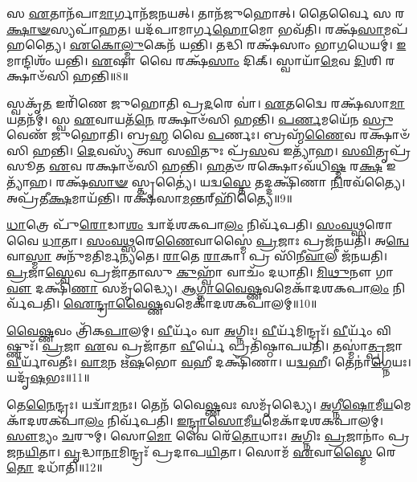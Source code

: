 𑌸 \ul{𑌏}\-𑌤𑌾𑌨᳴𑌪𑌾\-\ul{𑌮𑌾}\-𑌰𑍍𑌗𑌾𑌨᳴𑌜𑌨𑌯𑌤𑍍।
𑌤𑌾𑌨᳴𑌜𑍁𑌹𑍋𑌤𑍍।
𑌤𑍈𑌰𑍍𑌵𑍈 𑌸 𑌰\-\ul{𑌕𑍍𑌷𑌾}\-\-\ul{𑍟}\-𑌸𑍍𑌯𑌪𑌾᳴𑌹𑌤।
𑌯𑌦᳴𑌪𑌾𑌮𑌾𑌰𑍍𑌗\-\ul{𑌹𑍋}\-𑌮𑍋 𑌭𑌵᳴𑌤𑌿।
𑌰𑌕𑍍𑌷᳴\-\ul{𑌸𑌾}\-𑌮𑌪᳴𑌹𑌤𑍍𑌯𑍈।
\-\ul{𑌏}\-\-\ul{𑌕𑍋}\-\-\ul{𑌲𑍍𑌮𑍁}\-𑌕𑍇𑌨᳴ 𑌯𑌨𑍍𑌤𑌿।
𑌤𑌦𑍍𑌧𑌿 𑌰𑌕𑍍𑌷᳴𑌸𑌾𑌂 𑌭𑌾\-\ul{𑌗}\-𑌧𑍇𑌯𑌮𑍍॑।
\-\ul{𑌇}\-𑌮𑌾𑌨𑍍𑌦𑌿𑌶𑌂᳴ 𑌯𑌨𑍍𑌤𑌿।
\-\ul{𑌏}\-𑌷𑌾 𑌵𑍈 𑌰𑌕𑍍𑌷᳴\-\ul{𑌸𑌾𑌂} 𑌦𑌿𑌕𑍍।
𑌸𑍍𑌵𑌾𑌯𑌾᳴\-\ul{𑌮𑍇}\-𑌵 \ul{𑌦𑌿}\-𑌶𑌿 𑌰𑌕𑍍𑌷𑌾𑍞᳴𑌸𑌿 𑌹𑌨𑍍𑌤𑌿॥8॥

𑌸𑍍𑌵𑌕𑍃᳴\-\ul{𑌤} 𑌇𑌰𑌿᳴𑌣𑍇 𑌜𑍁𑌹𑍋𑌤𑌿 𑌪𑍍𑌰\-\ul{𑌦}\-𑌰𑍇 𑌵𑌾॑।
\-\ul{𑌏}\-𑌤𑌦𑍍𑌵𑍈 𑌰𑌕𑍍𑌷᳴𑌸𑌾\-\ul{𑌮𑌾}\-𑌯𑌤𑌨᳴𑌮𑍍।
𑌸𑍍𑌵 \ul{𑌏}\-𑌵𑌾𑌯𑌤᳴\-\ul{𑌨𑍇} 𑌰𑌕𑍍𑌷𑌾𑍞᳴𑌸𑌿 𑌹𑌨𑍍𑌤𑌿।
\-\ul{𑌪}\-\-\ul{𑌰𑍍𑌣}\-𑌮𑌯𑍇᳴𑌨 \ul{𑌸𑍍𑌰𑍁}\-𑌵𑍇𑌣᳴ 𑌜𑍁𑌹𑍋𑌤𑌿।
𑌬𑍍𑌰\-\ul{𑌹𑍍𑌮} 𑌵𑍈 \ul{𑌪}\-𑌰𑍍𑌣𑌃।
𑌬𑍍𑌰𑌹𑍍𑌮᳴\-\ul{𑌣𑍈}\-𑌵 𑌰𑌕𑍍𑌷𑌾𑍞᳴𑌸𑌿 𑌹𑌨𑍍𑌤𑌿।
\-\ul{𑌦𑍇}\-𑌵𑌸𑍍𑌯᳴ 𑌤𑍍𑌵𑌾 𑌸\-\ul{𑌵𑌿}\-𑌤𑍁𑌃 𑌪𑍍𑌰᳴\-\ul{𑌸}\-𑌵 𑌇𑌤𑍍𑌯𑌾᳴𑌹।
\-\ul{𑌸}\-\-\ul{𑌵𑌿}\-𑌤𑍃𑌪𑍍𑌰᳴𑌸𑍂𑌤 \ul{𑌏}\-𑌵 𑌰𑌕𑍍𑌷𑌾𑍞᳴𑌸𑌿 𑌹𑌨𑍍𑌤𑌿।
\-\ul{𑌹}\-𑌤𑍞 𑌰𑌕𑍍𑌷𑍋\-𑌽𑌵᳴𑌧𑌿\-\ul{𑌷𑍍𑌮} 𑌰\-\ul{𑌕𑍍𑌷} 𑌇𑌤𑍍𑌯𑌾᳴𑌹।
𑌰𑌕𑍍𑌷᳴\-\ul{𑌸𑌾}\-\-\ul{𑍟} 𑌸𑍍𑌤𑍃𑌤𑍍𑌯𑍈॑।
𑌯𑌦𑍍𑌵\-\ul{𑌸𑍍𑌤𑍇} 𑌤𑌦𑍍𑌦𑌕𑍍𑌷𑌿᳴𑌣𑌾 \ul{𑌨𑌿}\-𑌰𑌵᳴𑌤𑍍𑌯𑍈।
𑌅𑌪𑍍𑌰᳴𑌤𑍀\-\ul{𑌕𑍍𑌷}\-𑌮𑌾𑌯᳴𑌨𑍍𑌤𑌿।
𑌰𑌕𑍍𑌷᳴𑌸𑌾\-\ul{𑌮}\-𑌨𑍍𑌤𑌰𑍍‌\mbox{}𑌹𑌿᳴𑌤𑍍𑌯𑍈॥9॥\anuvakamend[\-\ul{𑌯}\-\-\ul{𑌚𑍍𑌛}\-\-\ul{𑌤𑌿} 𑌵𑌰𑍁᳴\-\ul{𑌣𑌂} 𑌤𑍃𑌤𑍀᳴\-\ul{𑌯𑌂} 𑌵𑌿𑌜𑌿᳴𑌤𑍍𑌯𑌾 𑌅\-𑌸𑍃𑌜\-\ul{𑌤} 𑌸𑌮𑍃᳴𑌦𑍍𑌧𑍍𑌯𑍈 𑌹\-\ul{𑌨𑍋} 𑌮𑌿𑌤𑍍𑌰᳴\-\ul{𑌦𑍍𑌰𑍁}\-𑌗𑌿𑌤𑌿᳴ 𑌹\-\ul{𑌨𑍍𑌤𑌿} 𑌸𑍍𑌤𑍃\-\ul{𑌤𑍍𑌯𑍈} 𑌤𑍍𑌰𑍀𑌣𑌿᳴ 𑌚]

\-\ul{𑌧𑌾}\-𑌤𑍍𑌰𑍇 𑌪𑍁᳴\-\ul{𑌰𑍋}\-𑌡𑌾\-\ul{𑌶𑌂} 𑌦𑍍𑌵𑌾𑌦᳴𑌶𑌕𑌪𑌾\-\ul{𑌲𑌂} 𑌨𑌿𑌰𑍍𑌵᳴𑌪𑌤𑌿।
\-\ul{𑌸𑌂}\-\-\ul{𑌵}\-\-\ul{𑌥𑍍𑌸}\-𑌰𑍋 𑌵𑍈 \ul{𑌧𑌾}\-𑌤𑌾।
\-\ul{𑌸𑌂}\-\-\ul{𑌵}\-\-\ul{𑌥𑍍𑌸}\-𑌰𑍇\-\ul{𑌣𑍈}\-𑌵𑌾𑌸𑍍𑌮𑍈॑ \ul{𑌪𑍍𑌰}\-𑌜𑌾𑌃 𑌪𑍍𑌰𑌜᳴𑌨𑌯𑌤𑌿।
𑌅\-\ul{𑌨𑍍𑌵𑍇}\-𑌵𑌾\-\ul{𑌸𑍍𑌮𑌾} 𑌅𑌨𑍁᳴𑌮𑌤𑌿𑌰𑍍𑌮𑌨𑍍𑌯𑌤𑍇।
\-\ul{𑌰𑌾}\-𑌤𑍇 \ul{𑌰𑌾}\-𑌕𑌾।
𑌪𑍍𑌰 𑌸𑌿᳴𑌨𑍀\-\ul{𑌵𑌾}\-𑌲𑍀 𑌜᳴𑌨𑌯𑌤𑌿।
\-\ul{𑌪𑍍𑌰}\-𑌜𑌾\-\ul{𑌸𑍍𑌵𑍇}\-𑌵 𑌪𑍍𑌰𑌜𑌾᳴𑌤𑌾𑌸𑍁 \ul{𑌕𑍁}\-𑌹𑍍𑌵𑌾᳴ 𑌵𑌾𑌚𑌂᳴ 𑌦𑌧𑌾𑌤𑌿।
\-\ul{𑌮𑌿}\-\-\ul{𑌥𑍁}\-𑌨𑍗 𑌗𑌾\-\ul{𑌵𑍗} 𑌦𑌕𑍍𑌷𑌿᳴\-\ul{𑌣𑌾} 𑌸𑌮𑍃᳴𑌦𑍍𑌧𑍍𑌯𑍈।
\-\ul{𑌆}\-\-\ul{𑌗𑍍𑌨𑌾}\-\-\ul{𑌵𑍈}\-\-\ul{𑌷𑍍𑌣}\-𑌵𑌮𑍇𑌕𑌾᳴\-𑌦𑌶\-𑌕𑌪𑌾\-\ul{𑌲𑌂} 𑌨𑌿𑌰𑍍𑌵᳴𑌪𑌤𑌿।
\-\ul{𑌐}\-\-\ul{𑌨𑍍𑌦𑍍𑌰𑌾}\-\-\ul{𑌵𑍈}\-\-\ul{𑌷𑍍𑌣}\-𑌵𑌮𑍇𑌕𑌾᳴\-𑌦𑌶\-𑌕𑌪𑌾𑌲𑌮𑍍॥10॥

\-\ul{𑌵𑍈}\-\-\ul{𑌷𑍍𑌣}\-𑌵𑌂 𑌤𑍍𑌰𑌿᳴𑌕\-\ul{𑌪𑌾}\-𑌲𑌮𑍍।
\-\ul{𑌵𑍀}\-𑌰𑍍𑌯𑌂᳴ 𑌵𑌾 \ul{𑌅}\-𑌗𑍍𑌨𑌿𑌃।
\-\ul{𑌵𑍀}\-𑌰𑍍𑌯᳴𑌮𑌿𑌨𑍍𑌦𑍍𑌰𑌃᳴।
\-\ul{𑌵𑍀}\-𑌰𑍍𑌯𑌂᳴ 𑌵𑌿𑌷𑍍𑌣𑍁𑌃᳴।
\-\ul{𑌪𑍍𑌰}\-𑌜𑌾 \ul{𑌏}\-𑌵 𑌪𑍍𑌰𑌜𑌾᳴𑌤𑌾 \ul{𑌵𑍀}\-𑌰𑍍𑌯𑍇॑ 𑌪𑍍𑌰𑌤𑌿᳴\-𑌷𑍍𑌠𑌾𑌪𑌯𑌤𑌿।
𑌤𑌸𑍍𑌮𑌾॑\-\ul{𑌤𑍍𑌪𑍍𑌰}\-𑌜𑌾 \ul{𑌵𑍀}\-𑌰𑍍𑌯𑌾᳴𑌵𑌤𑍀𑌃।
\-\ul{𑌵𑌾}\-\-\ul{𑌮}\-𑌨 𑌋᳴\-\ul{𑌷}\-𑌭𑍋 \ul{𑌵}\-𑌹𑍀 𑌦𑌕𑍍𑌷𑌿᳴𑌣𑌾।
𑌯\-\ul{𑌦𑍍𑌵}\-𑌹𑍀।
𑌤𑍇𑌨𑌾॑\-\ul{𑌗𑍍𑌨𑍇}\-𑌯𑌃।
𑌯𑌦𑍃᳴\-\ul{𑌷}\-𑌭𑌃॥11॥

𑌤𑍇\-\ul{𑌨𑍈}\-𑌨𑍍𑌦𑍍𑌰𑌃।
𑌯𑌦𑍍𑌵𑌾᳴\-\ul{𑌮}\-𑌨𑌃।
𑌤𑍇𑌨᳴ 𑌵𑍈\-\ul{𑌷𑍍𑌣}\-𑌵𑌃 𑌸𑌮𑍃᳴𑌦𑍍𑌧𑍍𑌯𑍈।
\-\ul{𑌅}\-\-\ul{𑌗𑍍𑌨𑍀}\-\-\ul{𑌷𑍋}\-𑌮𑍀\-\ul{𑌯}\-𑌮𑍇𑌕𑌾᳴\-\-𑌦𑌶\-𑌕𑌪𑌾\-\ul{𑌲𑌂} 𑌨𑌿𑌰𑍍𑌵᳴𑌪𑌤𑌿।
\-\ul{𑌇}\-\-\ul{𑌨𑍍𑌦𑍍𑌰𑌾}\-\-\ul{𑌸𑍋}\-𑌮𑍀\-\ul{𑌯}\-𑌮𑍇𑌕𑌾᳴\-𑌦𑌶\-𑌕𑌪𑌾𑌲𑌮𑍍।
\-\ul{𑌸𑍗}\-𑌮𑍍𑌯𑌂 \ul{𑌚}\-𑌰𑍁𑌮𑍍।
𑌸𑍋\-\ul{𑌮𑍋} 𑌵𑍈 𑌰𑍇᳴\-\ul{𑌤𑍋}\-𑌧𑌾𑌃।
\-\ul{𑌅}\-𑌗𑍍𑌨𑌿𑌃 \ul{𑌪𑍍𑌰}\-𑌜𑌾𑌨𑌾𑌂॑ 𑌪𑍍𑌰𑌜𑌨\-\ul{𑌯𑌿}\-𑌤𑌾।
\-\ul{𑌵𑍃}\-𑌦𑍍𑌧𑌾\-\ul{𑌨𑌾}\-𑌮𑌿𑌨𑍍𑌦𑍍𑌰𑌃᳴ 𑌪𑍍𑌰𑌦𑌾𑌪\-\ul{𑌯𑌿}\-𑌤𑌾।
𑌸𑍋𑌮᳴ \ul{𑌏}\-𑌵𑌾\-\ul{𑌸𑍍𑌮𑍈} 𑌰𑍇\-\ul{𑌤𑍋} 𑌦𑌧𑌾᳴𑌤𑌿॥12॥

